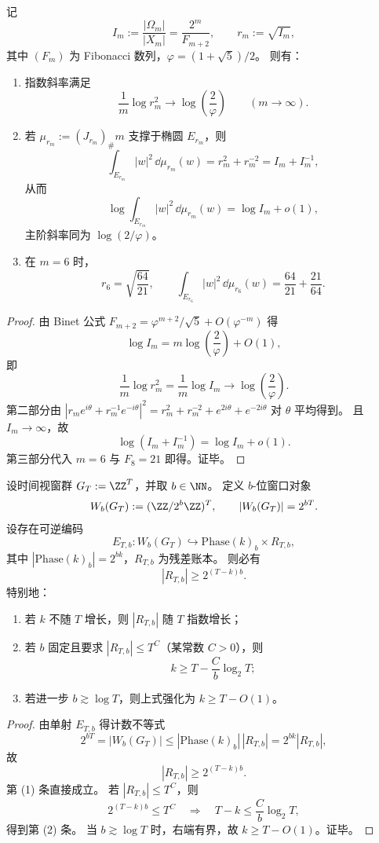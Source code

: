 \begin{theorem}[6D 折叠压缩比的椭圆化与黄金比指数实现]\label{thm:conclusion-6d-folding-golden-ellipse-realization}
记
\[
I_m:=\frac{|\Omega_m|}{|X_m|}=\frac{2^m}{F_{m+2}},
\qquad
r_m:=\sqrt{I_m},
\]
其中 \((F_m)\) 为 Fibonacci 数列，\(\varphi=(1+\sqrt5)/2\)。
则有：
\begin{enumerate}
  \item 指数斜率满足
  \[
  \frac{1}{m}\log r_m^2\longrightarrow \log\!\left(\frac{2}{\varphi}\right)\qquad(m\to\infty).
  \]
  \item 若 \(\mu_{r_m}:=(J_{r_m})_\#m\) 支撑于椭圆 \(E_{r_m}\)，则
  \[
  \int_{E_{r_m}}|w|^2\,\dd\mu_{r_m}(w)
  =r_m^2+r_m^{-2}
  =I_m+I_m^{-1},
  \]
  从而
  \[
  \log\!\int_{E_{r_m}}|w|^2\,\dd\mu_{r_m}(w)=\log I_m+o(1),
  \]
  主阶斜率同为 \(\log(2/\varphi)\)。
  \item 在 \(m=6\) 时，
  \[
  r_6=\sqrt{\frac{64}{21}},
  \qquad
  \int_{E_{r_6}}|w|^2\,\dd\mu_{r_6}(w)
  =\frac{64}{21}+\frac{21}{64}.
  \]
\end{enumerate}
\end{theorem}
\begin{proof}
由 Binet 公式 \(F_{m+2}=\varphi^{m+2}/\sqrt5+O(\varphi^{-m})\) 得
\[
\log I_m
=m\log\!\left(\frac{2}{\varphi}\right)+O(1),
\]
即
\[
\frac1m\log r_m^2=\frac1m\log I_m\to \log\!\left(\frac{2}{\varphi}\right).
\]
第二部分由
\(
|r_m e^{i\theta}+r_m^{-1}e^{-i\theta}|^2
=r_m^2+r_m^{-2}+e^{2i\theta}+e^{-2i\theta}
\)
对 \(\theta\) 平均得到。
且 \(I_m\to\infty\)，故
\[
\log(I_m+I_m^{-1})=\log I_m+o(1).
\]
第三部分代入 \(m=6\) 与 \(F_8=21\) 即得。证毕。
\end{proof}

\begin{theorem}[时间视窗的圆维下界与残差账本增长律]\label{thm:conclusion-time-window-cdim-ledger-lower-bound}
设时间视窗群 \(G_T:=\ZZ^T\)，并取 \(b\in\NN\)。
定义 \(b\)-位窗口对象
\[
W_b(G_T):=(\ZZ/2^b\ZZ)^T,\qquad |W_b(G_T)|=2^{bT}.
\]
设存在可逆编码
\[
E_{T,b}:W_b(G_T)\hookrightarrow \mathrm{Phase}(k)_b\times R_{T,b},
\]
其中 \(|\mathrm{Phase}(k)_b|=2^{bk}\)，\(R_{T,b}\) 为残差账本。
则必有
\[
|R_{T,b}|\ge 2^{(T-k)b}.
\]
特别地：
\begin{enumerate}
  \item 若 \(k\) 不随 \(T\) 增长，则 \(|R_{T,b}|\) 随 \(T\) 指数增长；
  \item 若 \(b\) 固定且要求 \(|R_{T,b}|\le T^C\)（某常数 \(C>0\)），则
  \[
  k\ge T-\frac{C}{b}\log_2 T;
  \]
  \item 若进一步 \(b\gtrsim \log T\)，则上式强化为 \(k\ge T-O(1)\)。
\end{enumerate}
\end{theorem}
\begin{proof}
由单射 \(E_{T,b}\) 得计数不等式
\[
2^{bT}=|W_b(G_T)|
\le
|\mathrm{Phase}(k)_b|\,|R_{T,b}|
=
2^{bk}|R_{T,b}|,
\]
故
\[
|R_{T,b}|\ge 2^{(T-k)b}.
\]
第 (1) 条直接成立。
若 \(|R_{T,b}|\le T^C\)，则
\[
2^{(T-k)b}\le T^C
\quad\Longrightarrow\quad
T-k\le \frac{C}{b}\log_2 T,
\]
得到第 (2) 条。
当 \(b\gtrsim \log T\) 时，右端有界，故 \(k\ge T-O(1)\)。证毕。
\end{proof}

